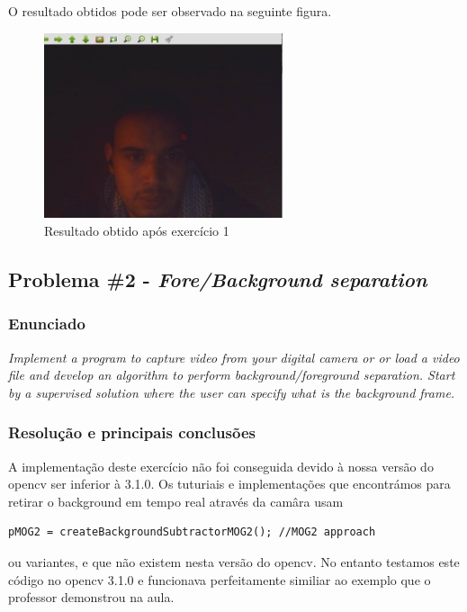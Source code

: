 \documentclass[portuguese, times, mirror]{revdetua}
\begin{document}
O resultado obtidos pode ser observado na seguinte figura. 

\begin{figure}[ht!]
\centering
\includegraphics[width=70mm]{img/ex1.jpg}
\caption{Resultado obtido após exercício 1}
\end{figure}



\subsection{Problema \#2 - \textit{Fore/Background separation}}

\subsubsection{Enunciado}
\textit{Implement a program to capture video from your digital camera or or load a video file and develop
an algorithm to perform background/foreground separation. Start by a supervised solution where
the user can specify what is the background frame.}


\subsubsection{Resolução e principais conclusões}

A implementação deste exercício não foi conseguida devido à nossa versão do opencv ser inferior à 3.1.0. Os tuturiais e implementações que encontrámos para retirar o background em tempo real através da camâra usam 
\begin{lstlisting}[caption=Aplicação da função createBackgroundSubtractorMOG2 ,label=code:C]
pMOG2 = createBackgroundSubtractorMOG2(); //MOG2 approach
\end{lstlisting}

ou variantes, e que não existem nesta versão do opencv. No entanto testamos este código no opencv 3.1.0 e funcionava perfeitamente similiar ao exemplo que o professor demonstrou na aula.
\end{document}
